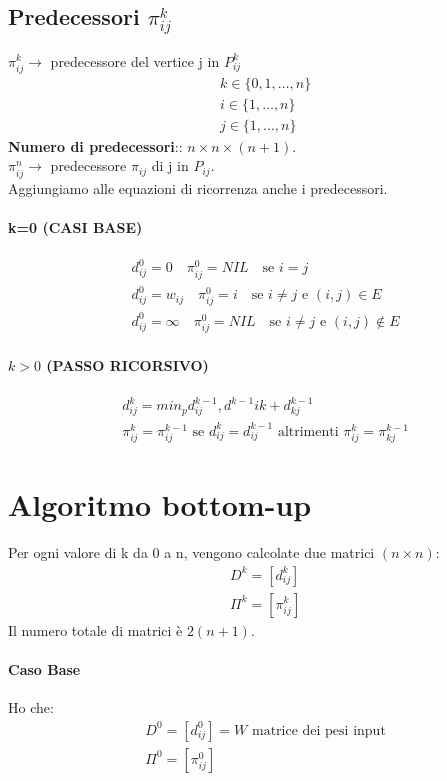 \subsection*{Predecessori $\pi^k_{ij}$}
$\pi^k_{ij} \rightarrow$ predecessore del vertice j in $P^k_{ij}$
\begin{align*}
    &k \in \{0,1,\dots,n\}\\
    &i \in \{1, \dots, n\}\\
    &j \in \{1,...,n\}
\end{align*}
\textbf{Numero di predecessori}:: $n \times n \times (n+1)$.\\
$\pi^n_{ij} \rightarrow $ predecessore $\pi_{ij}$ di j in $P_{ij}$.\\
Aggiungiamo alle equazioni di ricorrenza anche i predecessori.
\paragraph*{k=0 (CASI BASE)}
\begin{align*}
    &d^0_{ij} = 0 \quad \pi^0_{ij} = NIL \quad \text{se } i = j\\
    &d^0_{ij} = w_{ij} \quad \pi^0_{ij} = i \quad \text{se } i \neq j \text{ e } (i,j) \in E\\
    &d^0_{ij} = \infty \quad \pi^0_{ij}= NIL \quad \text{se } i \neq j \text{ e } (i,j) \notin E
\end{align*}
\paragraph*{$k>0$ (PASSO RICORSIVO)}
\begin{align*}
    &d^k_{ij} = min_p{d^{k-1}_{ij}, d^{k-1}{ik} + d^{k-1}_{kj}}\\
    &\pi^k_{ij} = \pi^{k-1}_{ij} \text{ se } d^k_{ij} = d^{k-1}_{ij} \text{ altrimenti } 
    \pi^k_{ij} = \pi^{k-1}_{kj}
\end{align*}
\section{Algoritmo bottom-up}
Per ogni valore di k da 0 a n, vengono calcolate due matrici $(n\times n)$:
\begin{align*}
    &D^k=[d^k_{ij}]\\
    &\Pi^k=[\pi^k_{ij}]
\end{align*}
Il numero totale di matrici è $2(n+1)$.
\paragraph*{Caso Base} Ho che:
\begin{align*}
    &D^0=[d^0_{ij}] = W \text{ matrice dei pesi input}\\
    &\Pi^0=[\pi^0_{ij}]
\end{align*}
